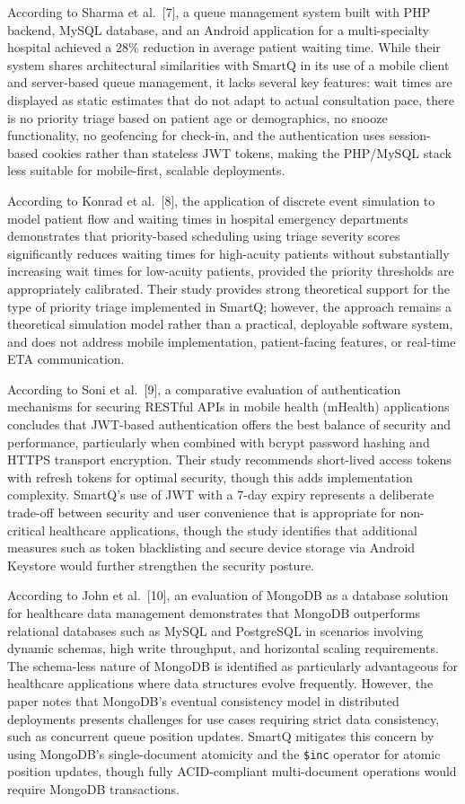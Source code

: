 \documentclass[12pt,a4paper]{article}
\begin{document}
According to Sharma et al.~[7], a queue management system built with PHP backend, MySQL database, and an Android application for a multi-specialty hospital achieved a 28\% reduction in average patient waiting time. While their system shares architectural similarities with SmartQ in its use of a mobile client and server-based queue management, it lacks several key features: wait times are displayed as static estimates that do not adapt to actual consultation pace, there is no priority triage based on patient age or demographics, no snooze functionality, no geofencing for check-in, and the authentication uses session-based cookies rather than stateless JWT tokens, making the PHP/MySQL stack less suitable for mobile-first, scalable deployments.

According to Konrad et al.~[8], the application of discrete event simulation to model patient flow and waiting times in hospital emergency departments demonstrates that priority-based scheduling using triage severity scores significantly reduces waiting times for high-acuity patients without substantially increasing wait times for low-acuity patients, provided the priority thresholds are appropriately calibrated. Their study provides strong theoretical support for the type of priority triage implemented in SmartQ; however, the approach remains a theoretical simulation model rather than a practical, deployable software system, and does not address mobile implementation, patient-facing features, or real-time ETA communication.

According to Soni et al.~[9], a comparative evaluation of authentication mechanisms for securing RESTful APIs in mobile health (mHealth) applications concludes that JWT-based authentication offers the best balance of security and performance, particularly when combined with bcrypt password hashing and HTTPS transport encryption. Their study recommends short-lived access tokens with refresh tokens for optimal security, though this adds implementation complexity. SmartQ's use of JWT with a 7-day expiry represents a deliberate trade-off between security and user convenience that is appropriate for non-critical healthcare applications, though the study identifies that additional measures such as token blacklisting and secure device storage via Android Keystore would further strengthen the security posture.

According to John et al.~[10], an evaluation of MongoDB as a database solution for healthcare data management demonstrates that MongoDB outperforms relational databases such as MySQL and PostgreSQL in scenarios involving dynamic schemas, high write throughput, and horizontal scaling requirements. The schema-less nature of MongoDB is identified as particularly advantageous for healthcare applications where data structures evolve frequently. However, the paper notes that MongoDB's eventual consistency model in distributed deployments presents challenges for use cases requiring strict data consistency, such as concurrent queue position updates. SmartQ mitigates this concern by using MongoDB's single-document atomicity and the \texttt{\$inc} operator for atomic position updates, though fully ACID-compliant multi-document operations would require MongoDB transactions.
\end{document}
